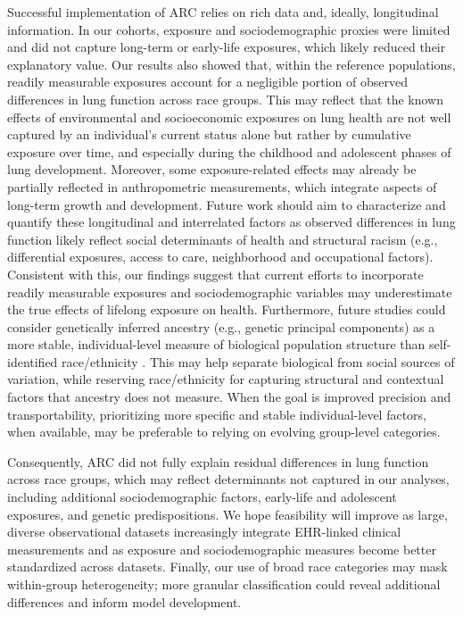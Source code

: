 \documentclass[10pt]{extarticle}
\begin{document}
Successful implementation of ARC relies on rich data and, ideally, longitudinal information. In our cohorts, exposure and sociodemographic proxies were limited and did not capture long-term or early-life exposures, which likely reduced their explanatory value. Our results also showed that, within the reference populations, readily measurable exposures account for a negligible portion of observed differences in lung function across race groups. This may reflect that the known effects of environmental and socioeconomic exposures on lung health are not well captured by an individual's current status alone but rather by cumulative exposure over time, and especially during the childhood and adolescent phases of lung development\cite{Dai2017-mi,Boezen2004-kt,Gauderman2004-xr}. Moreover, some exposure-related effects may already be partially reflected in anthropometric measurements, which integrate aspects of long-term growth and development\cite{Wadsworth2002-ci}. Future work should aim to characterize and quantify these longitudinal and interrelated factors as observed differences in lung function likely reflect social determinants of health and structural racism (e.g., differential exposures, access to care, neighborhood and occupational factors). Consistent with this, our findings suggest that current efforts to incorporate readily measurable exposures and sociodemographic variables may underestimate the true effects of lifelong exposure on health\cite{Patel2014-au}. Furthermore, future studies could consider genetically inferred ancestry (e.g., genetic principal components) as a more stable, individual-level measure of biological population structure than self-identified race/ethnicity \cite{Price2006-yq}. This may help separate biological from social sources of variation, while reserving race/ethnicity for capturing structural and contextual factors that ancestry does not measure. When the goal is improved precision and transportability, prioritizing more specific and stable individual-level factors, when available, may be preferable to relying on evolving group-level categories.

Consequently, ARC did not fully explain residual differences in lung function across race groups, which may reflect determinants not captured in our analyses, including additional sociodemographic factors, early-life and adolescent exposures, and genetic predispositions\cite{Shrine2019-zu,Menezes2015-ea,Shrine2023-fd,Kumar2010-rs,Dai2017-mi,Gauderman2004-xr,Boezen2004-kt,DeGroodt1988-go}. We hope feasibility will improve as large, diverse observational datasets increasingly integrate EHR-linked clinical measurements and as exposure and sociodemographic measures become better standardized across datasets\cite{Vermeulen2020-ag,Patel2025-nc}. Finally, our use of broad race categories may mask within-group heterogeneity; more granular classification could reveal additional differences and inform model development.
\end{document}

